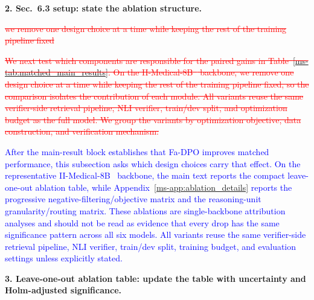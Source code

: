 \documentclass[12pt]{article}
\newcommand{\deleted}[1]{\textcolor{red}{\sout{#1}}}
\newcommand{\added}[1]{\textcolor{blue}{#1}}
\begin{document}
\textbf{2. Sec.~6.3 setup: state the ablation structure.}

\begin{displayquote}
\deleted{we remove one design choice at a time while keeping the rest of the training pipeline fixed}

\deleted{We next test which components are responsible for the paired gains in Table~\ref*{ms-tab:matched_main_results}. On the II-Medical-8B~\cite{intelligentinternet2025iimedical8b} backbone, we remove one design choice at a time while keeping the rest of the training pipeline fixed, so the comparison isolates the contribution of each module. All variants reuse the same verifier-side retrieval pipeline, NLI verifier, train/dev split, and optimization budget as the full model. We group the variants by optimization objective, data construction, and verification mechanism:}

\added{After the main-result block establishes that Fa-DPO improves matched performance, this subsection asks which design choices carry that effect. On the representative II-Medical-8B~\cite{intelligentinternet2025iimedical8b} backbone, the main text reports the compact leave-one-out ablation table, while Appendix~\ref*{ms-app:ablation_details} reports the progressive negative-filtering/objective matrix and the reasoning-unit granularity/routing matrix. These ablations are single-backbone attribution analyses and should not be read as evidence that every drop has the same significance pattern across all six models. All variants reuse the same verifier-side retrieval pipeline, NLI verifier, train/dev split, training budget, and evaluation settings unless explicitly stated.}
\end{displayquote}

\textbf{3. Leave-one-out ablation table: update the table with
uncertainty and Holm-adjusted significance.}
\end{document}
